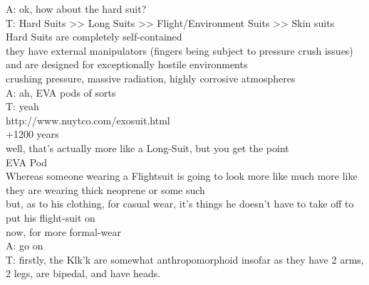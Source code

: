 A: ok, how about the hard suit?\\
T: Hard Suits >> Long Suits >> Flight/Environment Suits >> Skin suits\\
Hard Suits are completely self-contained\\
they have external manipulators (fingers being subject to pressure crush issues)\\
and are designed for exceptionally hostile environments\\
crushing pressure, massive radiation, highly corrosive atmospheres\\
A: ah, EVA pods of sorts\\
T: yeah\\
http://www.nuytco.com/exosuit.html\\
+1200 years\\
well, that's actually more like a Long-Suit, but you get the point\\
EVA Pod\\
Whereas someone wearing a Flightsuit is going to look more like much more like they are wearing thick neoprene or some such\\
but, as to his clothing, for casual wear, it's things he doesn't have to take off to put his flight-suit on\\
now, for more formal-wear\\
A: go on\\
T: firstly, the Klk'k are somewhat anthropomorphoid insofar as they have 2 arms, 2 legs, are bipedal, and have heads.\\

